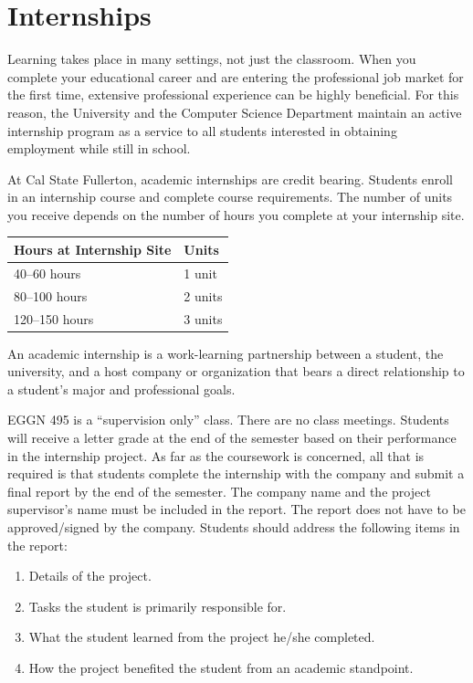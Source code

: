 \documentclass{book}
\begin{document}
\section{Internships}

Learning takes place in many settings, not just the classroom. When you complete your educational career and are entering the professional job market for the first time, extensive professional experience can be highly beneficial. For this reason, the University and the Computer Science Department maintain an active internship program as a service to all students interested in obtaining employment while still in school.

At Cal State Fullerton, academic internships are credit bearing. Students enroll in an internship course and complete course requirements. The number of units you receive depends on the number of hours you complete at your internship site.

\begin{center}
\begin{tabular}{|l|l|} \hline
  \textbf{Hours at Internship Site} & \textbf{Units} \\ \hline
  40--60 hours & 1 unit \\ \hline
  80--100 hours & 2 units \\ \hline
  120--150 hours & 3 units \\ \hline
\end{tabular}
\end{center}

An academic internship is a work-learning partnership between a student, the university, and a host company or organization that bears a direct relationship to a student’s major and professional goals.

EGGN 495 is a ``supervision only'' class. There are no class meetings. Students will receive a letter grade at the end of the semester based on their performance in the internship project. As far as the coursework is concerned, all that is required is that students complete the internship with the company and submit a final report by the end of the semester. The company name and the project supervisor’s name must be included in the report. The report does not have to be approved/signed by the company. Students should address the following items in the report:
\begin{enumerate}
\item Details of the project.
\item Tasks the student is primarily responsible for.
\item What the student learned from the project he/she completed.
\item How the project benefited the student from an academic standpoint.
\end{enumerate}
\end{document}
